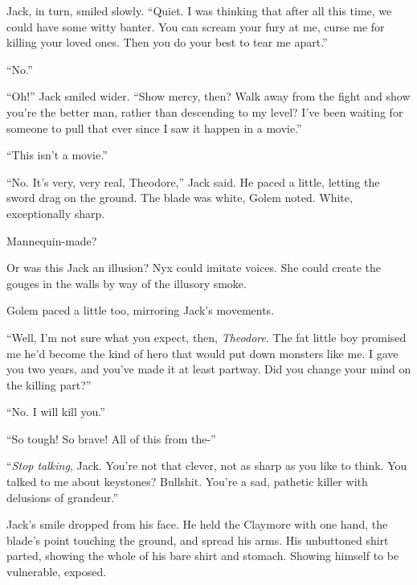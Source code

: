 Jack, in turn, smiled slowly.  ``Quiet.  I was thinking that after all this time, we could have some witty banter.  You can scream your fury at me, curse me for killing your loved ones.  Then you do your best to tear me apart.''



``No.''



``Oh!'' Jack smiled wider.  ``Show mercy, then?  Walk away from the fight and show you're the better man, rather than descending to my level?  I've been waiting for someone to pull that ever since I saw it happen in a movie.''



``This isn't a movie.''



``No.  It's very, very real, Theodore,'' Jack said.  He paced a little, letting the sword drag on the ground.  The blade was white, Golem noted.  White, exceptionally sharp.



Mannequin-made?



Or was this Jack an illusion?  Nyx could imitate voices.  She could create the gouges in the walls by way of the illusory smoke.



Golem paced a little too, mirroring Jack's movements.



``Well, I'm not sure what you expect, then, \emph{Theodore}.  The fat little boy promised me he'd become the kind of hero that would put down monsters like me.  I gave you two years, and you've made it at least partway.  Did you change your mind on the killing part?''



``No.  I will kill you.''



``So tough!  So brave!  All of this from the-''



``\emph{Stop talking}, Jack.  You're not that clever, not as sharp as you like to think.  You talked to me about keystones?  Bullshit.  You're a sad, pathetic killer with delusions of grandeur.''



Jack's smile dropped from his face.  He held the Claymore with one hand, the blade's point touching the ground, and spread his arms.  His unbuttoned shirt parted, showing the whole of his bare shirt and stomach.  Showing himself to be vulnerable, exposed.



